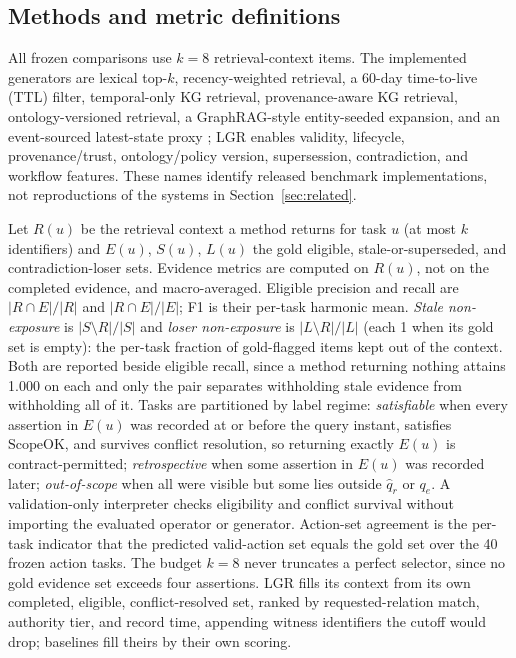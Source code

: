 \documentclass[conference]{IEEEtran}
\newcommand{\lgr}{\textsc{LGR}\xspace}
\begin{document}
\subsection{Methods and metric definitions}
\label{sec:metrics}
All frozen comparisons use $k=8$ retrieval-context items. The implemented generators are lexical top-$k$, recency-weighted retrieval, a 60-day time-to-live (TTL) filter, temporal-only KG retrieval, provenance-aware KG retrieval, ontology-versioned retrieval, a GraphRAG-style entity-seeded expansion, and an event-sourced latest-state proxy \cite{eventsourcing}; \lgr enables validity, lifecycle, provenance/trust, ontology/policy version, supersession, contradiction, and workflow features. These names identify released benchmark implementations, not reproductions of the systems in Section~\ref{sec:related}.

Let $R(u)$ be the retrieval context a method returns for task $u$ (at most $k$ identifiers) and $E(u)$, $S(u)$, $L(u)$ the gold eligible, stale-or-superseded, and contradiction-loser sets. Evidence metrics are computed on $R(u)$, not on the completed evidence, and macro-averaged. Eligible precision and recall are $|R\cap E|/|R|$ and $|R\cap E|/|E|$; F1 is their per-task harmonic mean. \emph{Stale non-exposure} is $|S\setminus R|/|S|$ and \emph{loser non-exposure} is $|L\setminus R|/|L|$ (each 1 when its gold set is empty): the per-task fraction of gold-flagged items kept out of the context. Both are reported beside eligible recall, since a method returning nothing attains 1.000 on each and only the pair separates withholding stale evidence from withholding all of it. Tasks are partitioned by label regime: \emph{satisfiable} when every assertion in $E(u)$ was recorded at or before the query instant, satisfies $\mathrm{ScopeOK}$, and survives conflict resolution, so returning exactly $E(u)$ is contract-permitted; \emph{retrospective} when some assertion in $E(u)$ was recorded later; \emph{out-of-scope} when all were visible but some lies outside $\hat q_r$ or $q_e$. A validation-only interpreter checks eligibility and conflict survival without importing the evaluated operator or generator. Action-set agreement is the per-task indicator that the predicted valid-action set equals the gold set over the 40 frozen action tasks. The budget $k=8$ never truncates a perfect selector, since no gold evidence set exceeds four assertions. \lgr fills its context from its own completed, eligible, conflict-resolved set, ranked by requested-relation match, authority tier, and record time, appending witness identifiers the cutoff would drop; baselines fill theirs by their own scoring.
\end{document}
